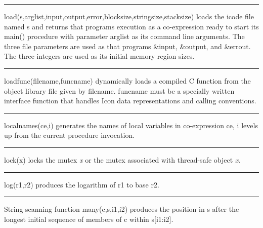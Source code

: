 \bigskip\hrule\vspace{0.1cm}

\noindent
{}\textsf{load(s,arglist,input,output,error,blocksize,stringsize,stacksize)}
loads the icode file named \textsf{s} and returns that
program{\textquotesingle}s execution as a co-expression ready to start
its \textsf{main()} procedure with parameter \textsf{arglist} as its
command line arguments. The three file parameters are used as that
program{\textquotesingle}s \textsf{\&input}, \textsf{\&output}, and
\textsf{\&errout}. The three integers are used as its initial memory
region sizes.

\bigskip\hrule\vspace{0.1cm}

\noindent
{}\textsf{loadfunc(filename,funcname)} dynamically
loads a compiled C function from the object library file given by
\textsf{filename}. \textsf{funcname} must be a specially written
interface function that handles Icon data representations and calling
conventions.

\bigskip\hrule\vspace{0.1cm}

\noindent
{}\textsf{localnames(ce,i)} generates the
names of local variables in co-expression \textsf{ce}, \textsf{i}
levels up from the current procedure invocation.

\bigskip\hrule\vspace{0.1cm}

\noindent
{}\textsf{lock(x)} locks the mutex {\textit x} or the mutex
associated with thread-safe object {\textit x}.

\bigskip\hrule\vspace{0.1cm}

\noindent
{}\textsf{log(r1,r2)} produces the logarithm of
\textsf{r1} to base \textsf{r2}.

\bigskip\hrule\vspace{0.1cm}

\noindent
{}String scanning function \textsf{many(c,s,i1,i2)} produces
the position in \textsf{s} after the longest initial sequence of
members of \textsf{c} within \textsf{s[i1:i2]}.

